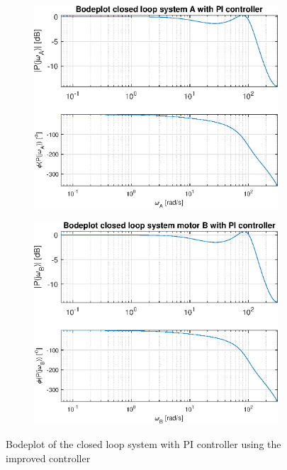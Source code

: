 \documentclass[a4paper,kul]{kulakarticle} %
\begin{document}
\begin{figure}[htp!]
	\centering
	\begin{subfigure}[b]{0.49\textwidth}
		\centering
		\includegraphics[width=\linewidth]{bodeplotA_cl_method2.eps}
		
	\end{subfigure}
	\hfill
	\begin{subfigure}[b]{0.49\textwidth}  
		\centering
		\includegraphics[width=\linewidth]{bodeplotB_cl_method2.eps}
		
	\end{subfigure}
	\caption{Bodeplot of the closed loop system with PI controller using the improved controller}
	\label{fig:bodeplotclmethod2}
\end{figure}
\end{document}

